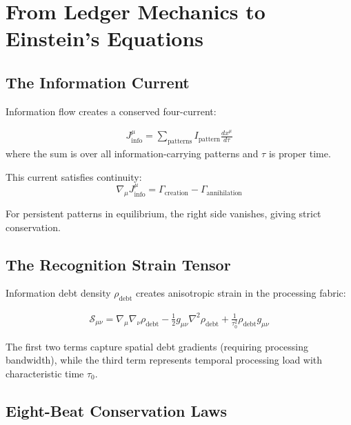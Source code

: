 \documentclass[12pt]{article}
\begin{document}
\section{From Ledger Mechanics to Einstein's Equations}

\subsection{The Information Current}

Information flow creates a conserved four-current:

\begin{definition}
\begin{align}
J^\mu_{\text{info}} = \sum_{\text{patterns}} I_{\text{pattern}} \frac{dx^\mu}{d\tau}
\end{align}
where the sum is over all information-carrying patterns and $\tau$ is proper time.
\end{definition}

This current satisfies continuity:
\begin{equation}
\nabla_\mu J^\mu_{\text{info}} = \Gamma_{\text{creation}} - \Gamma_{\text{annihilation}}
\end{equation}

For persistent patterns in equilibrium, the right side vanishes, giving strict conservation.

\subsection{The Recognition Strain Tensor}

Information debt density $\rho_{\text{debt}}$ creates anisotropic strain in the processing fabric:

\begin{definition}
\begin{align}
\mathcal{S}_{\mu\nu} = \nabla_\mu \nabla_\nu \rho_{\text{debt}} - \frac{1}{2}g_{\mu\nu}\nabla^2 \rho_{\text{debt}} + \frac{1}{\tau_0^2} \rho_{\text{debt}} g_{\mu\nu}
\end{align}
\end{definition}

The first two terms capture spatial debt gradients (requiring processing bandwidth), while the third term represents temporal processing load with characteristic time $\tau_0$.

\subsection{Eight-Beat Conservation Laws}
\end{document}
